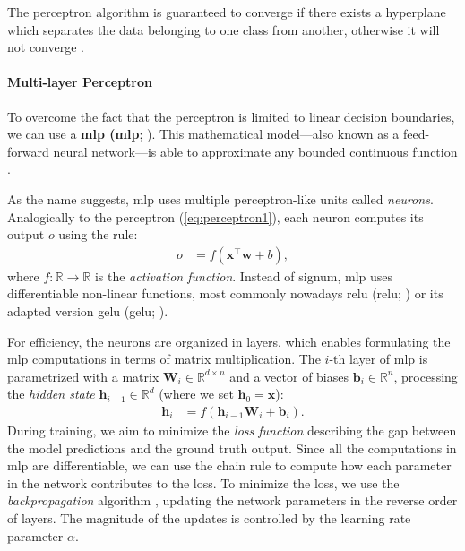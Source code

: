 The perceptron algorithm is guaranteed to converge if there exists a hyperplane which separates the data belonging to one class from another, otherwise it will not converge \cite{novikoff1962convergence}.

\paragraph{Multi-layer Perceptron} To overcome the fact that the perceptron is limited to linear decision boundaries, we can use a \textbf{\acl{mlp} (\acs{mlp}}; \citealp[p.~164]{goodfellow2016deep}). This mathematical model---also known as a feed-forward neural network---is able to approximate any bounded continuous function \cite{hornik1989multilayer}.

As the name suggests, \ac{mlp} uses multiple perceptron-like units called \textit{neurons}. Analogically to the perceptron (\autoref{eq:perceptron1}), each neuron computes its output $o$ using the rule:
\begin{align}
    o & = f(\mathbf{x}^\top \mathbf{w}  + b),
\end{align}
where $f: \mathbb{R} \rightarrow \mathbb{R}$ is the \emph{activation function}. Instead of signum, \ac{mlp} uses differentiable non-linear functions, most commonly nowadays \acl{relu} (\acs{relu}; \citealp{nair2010rectified}) or its adapted version \acl{gelu} (\acs{gelu}; \citealp{hendrycks2016gaussian}).

For efficiency, the neurons are organized in layers, which enables formulating the \ac{mlp} computations in terms of matrix multiplication. The $i$-th layer of \ac{mlp} is parametrized with a matrix $\mathbf{W}_i \in \mathbb{R}^{d\times n}$ and a vector of biases $\mathbf{b}_i \in \mathbb{R}^{n}$, processing the \textit{hidden state} $\mathbf{h}_{i-1} \in \mathbb{R}^{d}$ (where we set $\textbf{h}_0 = \textbf{x}$):
\begin{align}
    \mathbf{h}_i & = f(\mathbf{h}_{i-1} \mathbf{W}_i + \mathbf{b}_i).
\end{align}
During training, we aim to minimize the \textit{loss function} describing the gap between the model predictions and the ground truth output. Since all the computations in \ac{mlp} are differentiable, we can use the chain rule to compute how each parameter in the network contributes to the loss. To minimize the loss, we use the \emph{backpropagation} algorithm \cite{kelley1960gradient,rumelhart1986learning}, updating the network parameters in the reverse order of layers. The magnitude of the updates is controlled by the learning rate parameter $\alpha$.

